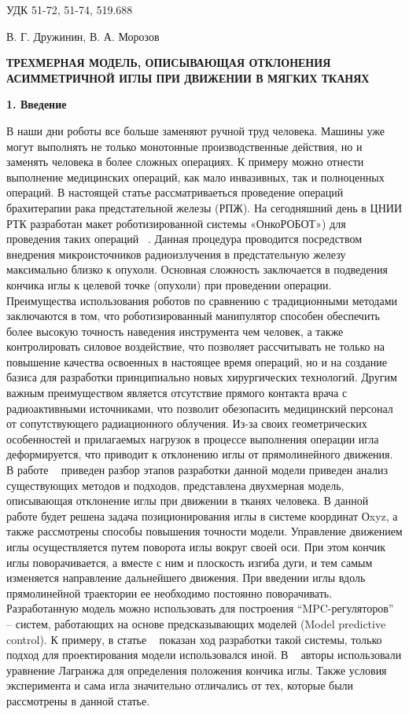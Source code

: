 \documentclass[10pt]{article}
\begin{document}
\large \noindent  УДК 51-72, 51-74, 519.688

\bigskip

 В. Г. Дружинин, В. А. Морозов
 
\begin{center}
\bf ТРЕХМЕРНАЯ МОДЕЛЬ, ОПИСЫВАЮЩАЯ ОТКЛОНЕНИЯ АСИММЕТРИЧНОЙ ИГЛЫ ПРИ ДВИЖЕНИИ В МЯГКИХ ТКАНЯХ
\end{center}

\bigskip
\textbf{1. Введение}

\bigskip
В наши дни роботы все больше заменяют ручной труд человека. Машины уже могут выполнять не только монотонные производственные действия, но и заменять человека в более сложных операциях. К примеру можно отнести выполнение медицинских операций, как мало инвазивных, так и полноценных операций.
В настоящей статье рассматриваеться проведение операций брахитерапии рака предстательной железы (РПЖ). На сегодняшний день в ЦНИИ РТК разработан макет роботизированной системы «ОнкоРОБОТ») для проведения таких операций ~\cite{one, two}. 
Данная процедура проводится посредством внедрения микроисточников радиоизлучения в предстательную железу максимально близко к опухоли. Основная сложность заключается в подведения кончика иглы к целевой точке (опухоли) при проведении операции.
Преимущества использования роботов по сравнению с традиционными методами заключаются в том, что роботизированный манипулятор способен обеспечить более высокую точность наведения инструмента чем человек, а также контролировать силовое воздействие, что позволяет рассчитывать не только на повышение качества освоенных в настоящее время операций, но и на создание базиса для разработки принципиально новых хирургических технологий. 
Другим важным преимуществом является отсутствие прямого контакта врача с радиоактивными источниками, что позволит обезопасить медицинский персонал от сопутствующего радиационного облучения.
Из-за своих геометрических особенностей и прилагаемых нагрузок в процессе выполнения операции игла деформируется, что приводит к отклонению иглы от прямолинейного движения. 
В работе ~\cite{three} приведен разбор этапов разработки данной модели приведен анализ существующих методов и подходов, представлена двухмерная модель, описывающая отклонение иглы при движении в тканях человека. 
В данной работе будет решена задача позиционирования иглы в системе координат Оxyz, а также рассмотрены способы повышения точности модели. 
Управление движением иглы осуществляется путем поворота иглы вокруг своей оси. При этом кончик иглы поворачивается, а вместе с ним и плоскость изгиба дуги, 
и тем самым изменяется направление дальнейшего движения. При введении иглы вдоль прямолинейной траектории ее необходимо постоянно поворачивать.
Разработанную модель можно использовать для построения “MPC-регуляторов” – систем, работающих на основе предсказывающих моделей (Model predictive control).
К примеру, в статье ~\cite{four} показан ход разработки такой системы, только подход для проектирования модели использовался иной. В ~\cite{four} авторы использовали уравнение Лагранжа для определения положения кончика иглы. Также условия эксперимента и сама игла значительно отличались от тех, которые были рассмотрены в данной статье.
\end{document}
